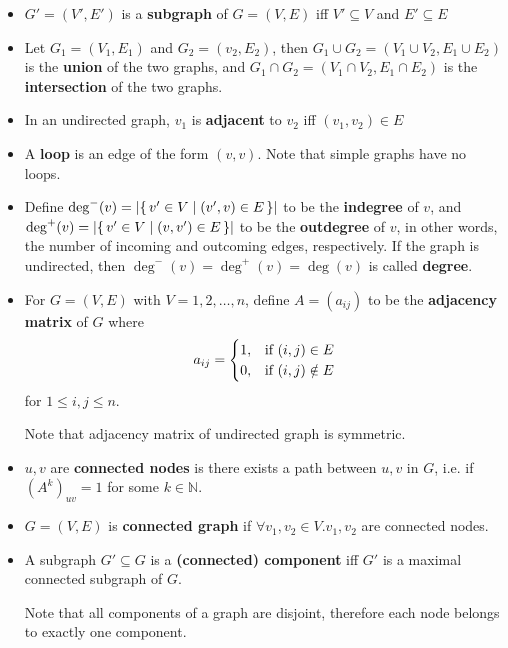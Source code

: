 \begin{definition}
    \begin{itemize}[leftmargin=*]
        \item $G' = (V', E')$ is a \textbf{subgraph} of $G = (V, E)$ iff $V' \subseteq V$ and $E' \subseteq E$
        \item Let $G_1 = (V_1, E_1)$ and $G_2 = (v_2, E_2)$, then $G_1 \cup G_2 = (V_1 \cup V_2, E_1 \cup E_2)$ is the \textbf{union} of the two graphs, and $G_1 \cap G_2 = (V_1 {\cap} V_2, E_1 {\cap} E_2)$ is the \textbf{intersection} of the two graphs.
    \end{itemize}
\end{definition}

\begin{definition}
    \begin{itemize}[leftmargin=*]
        \item In an undirected graph, $v_1$ is \textbf{adjacent} to $v_2$ iff $(v_1, v_2) \in E$
        \item A \textbf{loop} is an edge of the form $(v, v)$.
        Note that simple graphs have no loops.
        \item Define $\deg^-(v) = \left| \{\, v' \in V \mid (v', v) \in E \, \} \right|$ to be the \textbf{indegree} of $v$, and $\deg^+(v) = \left| \{\, v' \in V \mid (v, v') \in E \, \} \right|$ to be the \textbf{outdegree} of $v$, in other words, the number of incoming and outcoming edges, respectively.
        If the graph is undirected, then $\deg^-(v) = \deg^+(v) = \deg(v)$ is called \textbf{degree}.
        \item For $G = (V, E)$ with $V = {1, 2, \dots, n}$, define $A = (a_{ij})$ to be the \textbf{adjacency matrix} of $G$ where
        \[ a_{ij} = \begin{cases}
                        1, & \textnormal{if}\ (i, j) \in E \\
                        0, & \textnormal{if}\ (i, j) \notin E
        \end{cases} \]
        for $1 \leq i, j \leq n$.

        Note that adjacency matrix of undirected graph is symmetric.
    \end{itemize}
\end{definition}

\begin{definition}[Connectedness]
    \begin{itemize}[leftmargin=*]
        \item $u, v$ are \textbf{connected nodes} is there exists a path between $u, v$ in $G$, i.e. if $(A^k)_{uv} = 1$ for some $k\in \mathbb{N}$.
        \item $G = (V, E)$ is \textbf{connected graph} if $\forall v_1, v_2 \in V. v_1, v_2$ are connected nodes.
        \item A subgraph $G' \subseteq G$ is a \textbf{(connected) component} iff $G'$ is a maximal connected subgraph of $G$.

        Note that all components of a graph are disjoint, therefore each node belongs to exactly one component.
    \end{itemize}
\end{definition}

